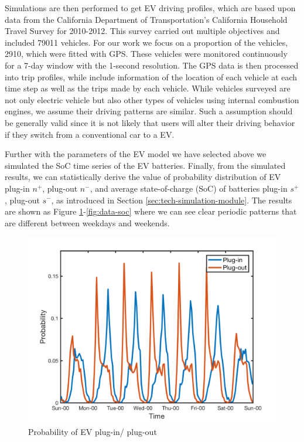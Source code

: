 Simulations are then performed to get EV driving profiles, which are based upon data from the California Department of Transportation's California Household Travel Survey for 2010-2012\cite{NREL_TSDC}. This survey carried out multiple objectives and included 79011 vehicles. For our work we focus on a proportion of the vehicles, 2910, which were fitted with GPS. These vehicles were monitored continuously for a 7-day window with the 1-second resolution. The GPS data is then processed into trip profiles, while include information of the location of each vehicle at each time step as well as the trips made by each vehicle. While vehicles surveyed are not only electric vehicle but also other types of vehicles using internal combustion engines, we assume their driving patterns are similar. Such a assumption should be generally valid since it is not likely that users will alter their driving behavior if they switch from a conventional car to a EV. 

Further with the parameters of the EV model we have selected above we simulated the SoC time series of the EV batteries. Finally, from the simulated results, we can statistically derive the value of probability distribution of EV plug-in $n^+$, plug-out $n^-$, and average state-of-charge (SoC) of batteries plug-in $s^+$, plug-out $s^-$, as introduced in Section \ref{sec:tech-simulation-module}. The results are shown as Figure \ref{fig:data-ev-number}-\ref{fig:data-soc} where we can see clear periodic patterns that are different between weekdays and weekends.

\begin{figure}[h!]
	\centering
	\centering
	\includegraphics[width=0.8\linewidth]{Figures/Data_EV_number}
	\caption{Probability of EV plug-in/ plug-out}
	\label{fig:data-ev-number}
\end{figure}

